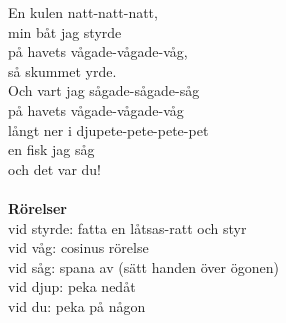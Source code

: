 \vspace{10pt}
En kulen natt-natt-natt,\\
min båt jag styrde\\
på havets vågade-vågade-våg,\\
så skummet yrde.\\
Och vart jag sågade-sågade-såg\\
på havets vågade-vågade-våg\\
långt ner i djupete-pete-pete-pet\\
en fisk jag såg\\
och det var du!\\
\\
\textbf{Rörelser}\\
vid styrde: fatta en låtsas-ratt och styr\\
vid våg: cosinus rörelse\\
vid såg: spana av (sätt handen över ögonen)\\
vid djup: peka nedåt\\
vid du: peka på någon
